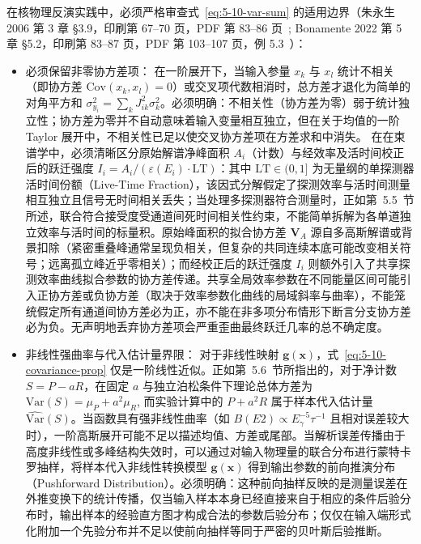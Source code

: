 在核物理反演实践中，必须严格审查式~\eqref{eq:5-10-var-sum} 的适用边界（朱永生 2006 第 3 章 §3.9，印刷第 67--70 页，PDF 第 83--86 页~\cite{book-zhu-probability-statistics-in-physics}; Bonamente 2022 第 5 章 §5.2，印刷第 83--87 页，PDF 第 103--107 页，例 5.3~\cite{book-bonamente-statistics-scientific-data}）：
\begin{itemize}
\item 必须保留非零协方差项：
在一阶展开下，当输入参量 $x_k$ 与 $x_l$ 统计不相关（即协方差 $\mathrm{Cov}(x_k, x_l) = 0$）或交叉项代数相消时，总方差才退化为简单的对角平方和 $\sigma_{y_i}^2 = \sum_k J_{ik}^2 \sigma_k^2$。必须明确：不相关性（协方差为零）弱于统计独立性；协方差为零并不自动意味着输入变量相互独立，但在关于均值的一阶 Taylor 展开中，不相关性已足以使交叉协方差项在方差求和中消失。
在在束谱学中，必须清晰区分原始解谱净峰面积 $A_i$（计数）与经效率及活时间校正后的跃迁强度 $I_i = A_i / (\varepsilon(E_i) \cdot \mathrm{LT})$：其中 $\mathrm{LT} \in (0, 1]$ 为无量纲的单探测器活时间份额（Live-Time Fraction），该因式分解假定了探测效率与活时间测量相互独立且信号无时间相关丢失；当处理多探测器符合测量时，正如第~5.5~节所述，联合符合接受度受通道间死时间相关性约束，不能简单拆解为各单道独立效率与活时间的标量积。原始峰面积的拟合协方差 $\mathbf{V}_A$ 源自多高斯解谱或背景扣除（紧密重叠峰通常呈现负相关，但复杂的共同连续本底可能改变相关符号；远离孤立峰近乎零相关）；而经校正后的跃迁强度 $I_i$ 则额外引入了共享探测效率曲线拟合参数的协方差传递。共享全局效率参数在不同能量区间可能引入正协方差或负协方差（取决于效率参数化曲线的局域斜率与曲率），不能笼统假定所有通道间协方差必为正，亦不能在非多项分布情形下断言分支协方差必为负。无声明地丢弃协方差项会严重歪曲最终跃迁几率的总不确定度。
\item 非线性强曲率与代入估计量界限：
对于非线性映射 $\mathbf{g}(\mathbf{x})$，式~\eqref{eq:5-10-covariance-prop} 仅是一阶线性近似。正如第~5.6~节所指出的，对于净计数 $S = P - aR$，在固定 $a$ 与独立泊松条件下理论总体方差为 $\mathrm{Var}(S) = \mu_P + a^2 \mu_R$, 而实验计算中的 $P + a^2 R$ 属于样本代入估计量 $\widehat{\mathrm{Var}}(S)$。当函数具有强非线性曲率（如 $B(E2) \propto E_\gamma^{-5} \tau^{-1}$ 且相对误差较大时），一阶高斯展开可能不足以描述均值、方差或尾部。当解析误差传播由于高度非线性或多峰结构失效时，可以通过对输入物理量的联合分布进行蒙特卡罗抽样，将样本代入非线性转换模型 $\mathbf{g}(\mathbf{x})$ 得到输出参数的前向推演分布（Pushforward Distribution）。必须明确：这种前向抽样反映的是测量误差在外推变换下的统计传播，仅当输入样本本身已经直接来自于相应的条件后验分布时，输出样本的经验直方图才构成合法的参数后验分布；仅仅在输入端形式化附加一个先验分布并不足以使前向抽样等同于严密的贝叶斯后验推断。
\end{itemize}

